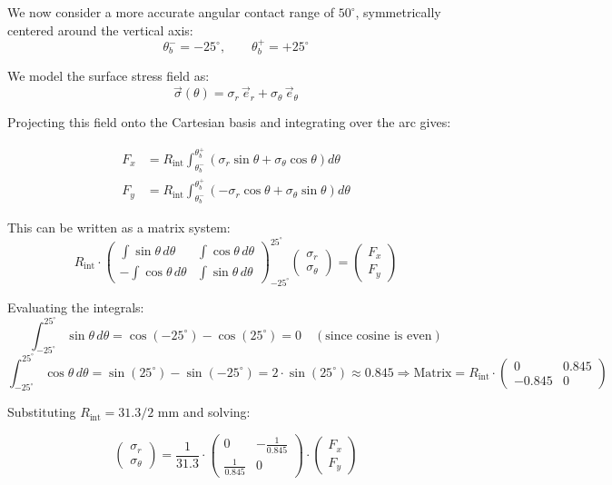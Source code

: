 \documentclass[12pt]{article}
\begin{document}
We now consider a more accurate angular contact range of $50^\circ$, symmetrically centered around the vertical axis:
\[
\theta_b^- = -25^\circ, \qquad \theta_b^+ = +25^\circ
\]

We model the surface stress field as:
\[
\vec{\sigma}(\theta) = \sigma_r \, \vec{e}_r + \sigma_\theta \, \vec{e}_\theta
\]

Projecting this field onto the Cartesian basis and integrating over the arc gives:

\begin{align*}
F_x &= R_{\text{int}} \int_{\theta_b^-}^{\theta_b^+} \left( \sigma_r \sin\theta + \sigma_\theta \cos\theta \right) d\theta \\
F_y &= R_{\text{int}} \int_{\theta_b^-}^{\theta_b^+} \left( -\sigma_r \cos\theta + \sigma_\theta \sin\theta \right) d\theta
\end{align*}

This can be written as a matrix system:
\[
R_{\text{int}} \cdot
\begin{pmatrix}
\int \sin\theta \, d\theta & \int \cos\theta \, d\theta \\
-\int \cos\theta \, d\theta & \int \sin\theta \, d\theta
\end{pmatrix}_{-25^\circ}^{25^\circ}
\begin{pmatrix}
\sigma_r \\
\sigma_\theta
\end{pmatrix}
=
\begin{pmatrix}
F_x \\
F_y
\end{pmatrix}
\]

Evaluating the integrals:
\[
\int_{-25^\circ}^{25^\circ} \sin\theta \, d\theta = \cos(-25^\circ) - \cos(25^\circ) = 0 \quad (\text{since cosine is even})
\]
\[
\int_{-25^\circ}^{25^\circ} \cos\theta \, d\theta = \sin(25^\circ) - \sin(-25^\circ) = 2 \cdot \sin(25^\circ) \approx 0.845

\Rightarrow
\text{Matrix} =
R_{\text{int}} \cdot
\begin{pmatrix}
0 & 0.845 \\
-0.845 & 0
\end{pmatrix}
\]

Substituting $R_{\text{int}} = 31.3/2$ mm and solving:

\[
\begin{pmatrix}
\sigma_r \\
\sigma_\theta
\end{pmatrix}
=
\frac{1}{31.3}
\cdot
\begin{pmatrix}
0 & -\frac{1}{0.845} \\
\frac{1}{0.845} & 0
\end{pmatrix}
\cdot
\begin{pmatrix}
F_x \\
F_y
\end{pmatrix}
\]
\end{document}
